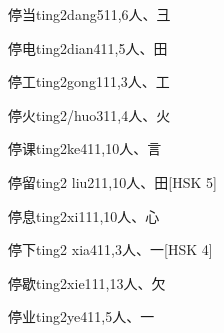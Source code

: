 \begin{EntryWithPhonetic}{停当}{ting2dang5}{11,6}{⼈、⼹}
\end{EntryWithPhonetic}

\begin{EntryWithPhonetic}{停电}{ting2dian4}{11,5}{⼈、⽥}
\end{EntryWithPhonetic}

\begin{EntryWithPhonetic}{停工}{ting2gong1}{11,3}{⼈、⼯}
\end{EntryWithPhonetic}

\begin{EntryWithPhonetic}{停火}{ting2/huo3}{11,4}{⼈、⽕}
\end{EntryWithPhonetic}

\begin{EntryWithPhonetic}{停课}{ting2ke4}{11,10}{⼈、⾔}
\end{EntryWithPhonetic}

\begin{EntryWithPhonetic}{停留}{ting2 liu2}{11,10}{⼈、⽥}[HSK 5]
\end{EntryWithPhonetic}

\begin{EntryWithPhonetic}{停息}{ting2xi1}{11,10}{⼈、⼼}
\end{EntryWithPhonetic}

\begin{EntryWithPhonetic}{停下}{ting2 xia4}{11,3}{⼈、⼀}[HSK 4]
\end{EntryWithPhonetic}

\begin{EntryWithPhonetic}{停歇}{ting2xie1}{11,13}{⼈、⽋}
\end{EntryWithPhonetic}

\begin{EntryWithPhonetic}{停业}{ting2ye4}{11,5}{⼈、⼀}
\end{EntryWithPhonetic}

